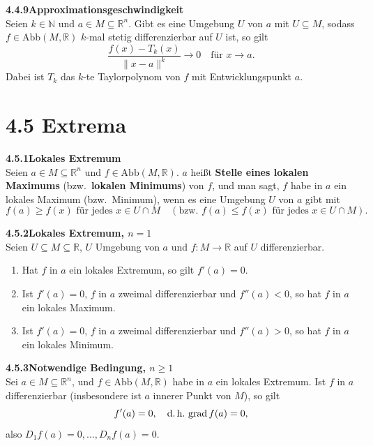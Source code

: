 \documentclass[a4paper,12pt]{article}
\newcommand{\gentry}[3]{%
  \noindent\textbf{#1\quad #2}\nopagebreak\\[0.2em]
  #3\par\smallskip
}
\begin{document}
\gentry{4.4.9}{Approximationsgeschwindigkeit}{%
  Seien $k \in \mathbb{N}$ und $a \in M \subseteq \mathbb{R}^n$. Gibt es eine Umgebung $U$
  von $a$ mit $U \subseteq M$, sodass $f \in \mathrm{Abb}(M, \mathbb{R})$ $k$-mal stetig
  differenzierbar auf $U$ ist, so gilt
  \[
    \frac{f(x) - T_k(x)}{\|x - a\|^k} \longrightarrow 0 \quad \text{für } x \to a.
  \]
  Dabei ist $T_k$ das $k$-te Taylorpolynom von $f$ mit Entwicklungspunkt $a$.
}

\section*{4.5 \quad Extrema}

\gentry{4.5.1}{Lokales Extremum}{%
  Seien $a \in M \subseteq \mathbb{R}^n$ und $f \in \mathrm{Abb}(M, \mathbb{R})$.
  $a$ heißt \textbf{Stelle eines lokalen Maximums} (bzw.\ \textbf{lokalen Minimums}) von $f$,
  und man sagt, $f$ habe in $a$ ein lokales Maximum (bzw.\ Minimum), wenn es eine Umgebung $U$
  von $a$ gibt mit
  \[
    f(a) \geq f(x) \text{ für jedes } x \in U \cap M \quad
    (\text{bzw.\ } f(a) \leq f(x) \text{ für jedes } x \in U \cap M).
  \]
}

\gentry{4.5.2}{Lokales Extremum, $n = 1$}{%
  Seien $U \subseteq M \subseteq \mathbb{R}$, $U$ Umgebung von $a$ und $f: M \to \mathbb{R}$
  auf $U$ differenzierbar.
  \begin{enumerate}[label=(\roman*),topsep=2pt,itemsep=1pt]
    \item Hat $f$ in $a$ ein lokales Extremum, so gilt $f'(a) = 0$.
    \item Ist $f'(a) = 0$, $f$ in $a$ zweimal differenzierbar und $f''(a) < 0$, so hat $f$ in $a$
          ein lokales Maximum.
    \item Ist $f'(a) = 0$, $f$ in $a$ zweimal differenzierbar und $f''(a) > 0$, so hat $f$ in $a$
          ein lokales Minimum.
  \end{enumerate}
}

\gentry{4.5.3}{Notwendige Bedingung, $n \geq 1$}{%
  Sei $a \in M \subseteq \mathbb{R}^n$, und $f \in \mathrm{Abb}(M, \mathbb{R})$ habe in $a$ ein
  lokales Extremum. Ist $f$ in $a$ differenzierbar (insbesondere ist $a$ innerer Punkt von $M$),
  so gilt
  \[
    f'(a) = 0, \quad \text{d.\,h.\ } \mathrm{grad}\,f(a) = 0,
  \]
  also $D_1 f(a) = 0, \ldots, D_n f(a) = 0$.
}
\end{document}
